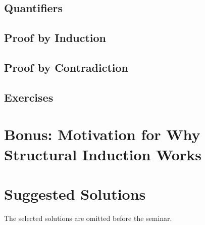 \documentclass{tufte-handout}
\begin{document}
\subsection{Quantifiers}

\subsection{Proof by Induction}

\subsection{Proof by Contradiction}

\subsection{Exercises}


\section{Bonus: Motivation for Why Structural Induction Works}


\section{Suggested Solutions}

The selected solutions are omitted before the seminar.
\end{document}
